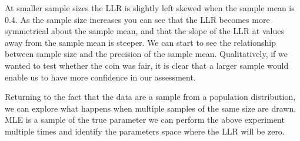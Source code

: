 \documentclass[letterpaper,10pt,english]{jupyterBook}
\begin{document}
\begin{sphinxVerbatim}[commandchars=\\\{\}]
\end{sphinxVerbatim}

\noindent{}

\sphinxAtStartPar
At smaller sample sizes the LLR is slightly left skewed when the sample mean is 0.4. As the sample size increases you can see that the LLR becomes more symmetrical about the sample mean, and that the slope of the LLR at values away from the sample mean is steeper. We can start to see the relationship between sample size and the precision of the sample mean. Qualitatively, if we wanted to test whether the coin was fair, it is clear that a larger sample would enable us to have more confidence in our assessment.

\sphinxAtStartPar
Returning to the fact that the data are a sample from a population distribution, we can explore what happens when multiple samples of the same size are drawn. MLE is a sample of the true parameter we can perform the above experiment multiple times and identify the parameters space where the LLR will be zero.

\begin{sphinxVerbatim}[commandchars=\\\{\}]
 
    
   
   
\end{sphinxVerbatim}
\end{document}
